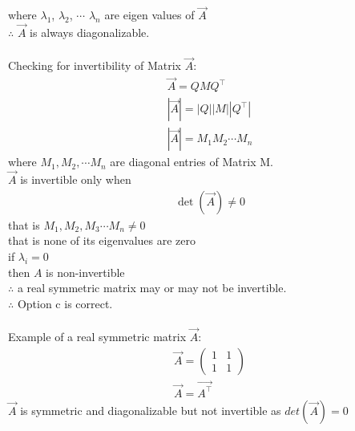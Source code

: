 \documentclass[journal]{IEEEtran}
\begin{document}
where $\lambda_1$, $\lambda_2$, $\cdots$ $\lambda_n$ are eigen values of $\vec{A}$\\
$\therefore$ $\vec{A}$ is always diagonalizable.\\\\
Checking for invertibility of Matrix  $\vec{A}$:
\begin{align}
\vec{A} = Q M Q^\top \\|\vec{A}| = |Q| |M| |Q^\top|\\
|\vec{A}| = M_1 M_2 \cdots M_n
\end{align}
where $M_1, M_2, \cdots M_n$ are diagonal entries of Matrix M.\\
$\vec{A}$ is invertible only when 
\begin{align}
\det(\vec{A}) \neq 0 
\end{align}
that is $M_1, M_2, M_3 \cdots M_n \neq 0$ \\
that is none of its eigenvalues are zero \\

if $\lambda_i = 0$ \\
then $A$ is non-invertible \\

$\therefore$ a real symmetric matrix may or may not be invertible.\\
$\therefore$ Option c is correct.\\\\
Example of a real symmetric matrix $\vec{A}$:
\begin{align}
    \vec{A}=\begin{pmatrix}
        1 & 1\\1& 1
    \end{pmatrix}\\
    \vec{A}=\vec{A^\top}
\end{align}
$\vec{A}$ is symmetric and diagonalizable but not invertible as $det(\vec{A})=0$
\end{document}
